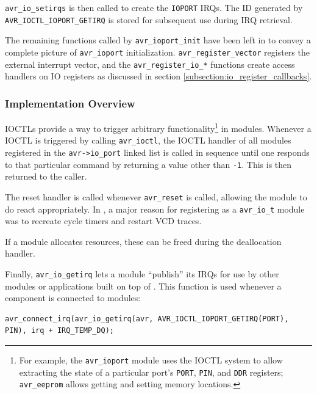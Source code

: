 \lstinline|avr_io_setirqs| is then called to create the \lstinline|IOPORT| \acp{IRQ}.
The \ac{ID} generated by \lstinline|AVR_IOCTL_IOPORT_GETIRQ| is stored for subsequent
use during \ac{IRQ} retrieval.

The remaining functions called by \lstinline|avr_ioport_init|
have been left in to convey a complete picture of \verb|avr_ioport|
initialization. \lstinline|avr_register_vector| registers the external interrupt vector,
and the \lstinline|avr_register_io_*| functions create access handlers on \ac{IO}
registers as discussed in section \ref{subsection:io_register_callbacks}.

\subsubsection{Implementation Overview}

\acp{IOCTL} provide a way to trigger arbitrary functionality\footnote{
%
For example, the \lstinline|avr_ioport|
module uses the \ac{IOCTL} system to allow extracting the state of a particular port's
\lstinline|PORT|, \lstinline|PIN|, and \lstinline|DDR| registers; \lstinline|avr_eeprom|
allows getting and setting memory locations.
%
} in modules. Whenever
a \ac{IOCTL} is triggered by calling \lstinline|avr_ioctl|, the \ac{IOCTL} handler
of all modules registered in the \lstinline|avr->io_port| linked list is called
in sequence until one responds to that particular command by returning a value
other than \lstinline|-1|. This is then returned to the caller.

The reset handler is called whenever \lstinline|avr_reset| is called, allowing
the module to do react appropriately. In \qsimavr, a major reason for registering
as a \lstinline|avr_io_t| module was to recreate cycle timers and restart \ac{VCD}
traces.

If a module allocates resources, these can be freed during the deallocation handler.

Finally, \lstinline|avr_io_getirq| lets a module ``publish'' its \acp{IRQ} for
use by other modules or applications built on top of \simavr. This function is
used whenever a \qsimavr component is connected to \simavr modules:

\begin{lstlisting}
avr_connect_irq(avr_io_getirq(avr, AVR_IOCTL_IOPORT_GETIRQ(PORT), PIN), irq + IRQ_TEMP_DQ);
\end{lstlisting}


